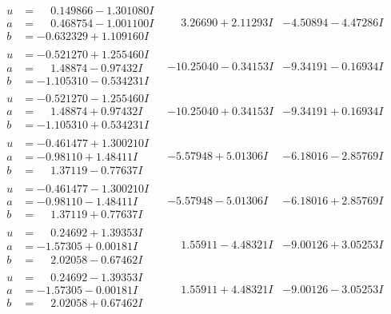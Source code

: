 \documentclass[1p]{elsarticle_modified}
\theoremstyle{definition}
\begin{document}
$$\begin{array}{c|c|c}
\begin{aligned}
u &= \phantom{-}0.149866 - 1.301080 I \\
a &= \phantom{-}0.468754 - 1.001100 I \\
b &= -0.632329 + 1.109160 I\end{aligned}
 & \phantom{-}3.26690 + 2.11293 I & -4.50894 - 4.47286 I \\ \hline\begin{aligned}
u &= -0.521270 + 1.255460 I \\
a &= \phantom{-}1.48874 - 0.97432 I \\
b &= -1.105310 - 0.534231 I\end{aligned}
 & -10.25040 - 0.34153 I & -9.34191 - 0.16934 I \\ \hline\begin{aligned}
u &= -0.521270 - 1.255460 I \\
a &= \phantom{-}1.48874 + 0.97432 I \\
b &= -1.105310 + 0.534231 I\end{aligned}
 & -10.25040 + 0.34153 I & -9.34191 + 0.16934 I \\ \hline\begin{aligned}
u &= -0.461477 + 1.300210 I \\
a &= -0.98110 + 1.48411 I \\
b &= \phantom{-}1.37119 - 0.77637 I\end{aligned}
 & -5.57948 + 5.01306 I & -6.18016 - 2.85769 I \\ \hline\begin{aligned}
u &= -0.461477 - 1.300210 I \\
a &= -0.98110 - 1.48411 I \\
b &= \phantom{-}1.37119 + 0.77637 I\end{aligned}
 & -5.57948 - 5.01306 I & -6.18016 + 2.85769 I \\ \hline\begin{aligned}
u &= \phantom{-}0.24692 + 1.39353 I \\
a &= -1.57305 + 0.00181 I \\
b &= \phantom{-}2.02058 - 0.67462 I\end{aligned}
 & \phantom{-}1.55911 - 4.48321 I & -9.00126 + 3.05253 I \\ \hline\begin{aligned}
u &= \phantom{-}0.24692 - 1.39353 I \\
a &= -1.57305 - 0.00181 I \\
b &= \phantom{-}2.02058 + 0.67462 I\end{aligned}
 & \phantom{-}1.55911 + 4.48321 I & -9.00126 - 3.05253 I \\ \hline\begin{aligned}

\end{aligned}
\end{array}$$
\end{document}
